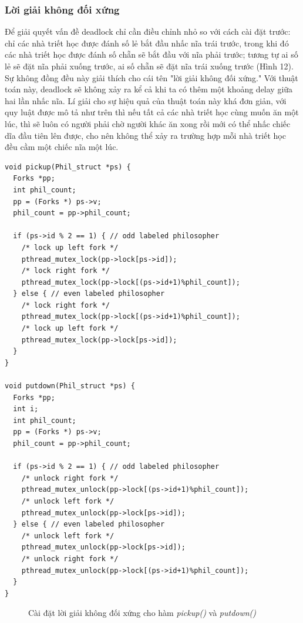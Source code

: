 \documentclass{article}
\begin{document}
\subsubsection{Lời giải không đối xứng}
Để giải quyết vấn đề deadlock chỉ cần điều chỉnh nhỏ so với cách cài đặt trước: chỉ các nhà triết học được đánh số lẻ
bắt đầu nhấc nĩa trái trước, trong khi đó các nhà triết học được đánh số chẵn sẽ bắt đầu với nĩa phải trước; tương tự
ai số lẻ sẽ đặt nĩa phải xuống trước, ai số chẵn sẽ đặt nĩa trái xuống trước (Hình 12). Sự không đồng đều này
giải thích cho cái tên "lời giải không đối xứng."
Với thuật toán này, deadlock sẽ không xảy ra kể cả khi ta có thêm một khoảng delay giữa hai lần nhấc nĩa.
Lí giải cho sự hiệu quả của thuật toán này khá đơn giản, với quy luật được mô tả như trên thì nếu tất cả
các nhà triết học cùng muốn ăn một lúc, thì sẽ luôn có người phải chờ người khác ăn xong rồi mới có thể nhấc
chiếc dĩa đầu tiên lên được, cho nên không thể xảy ra trường hợp mỗi nhà triết học đều cầm một chiếc nĩa một lúc.
\begin{shaded}
    \begin{lstlisting}
void pickup(Phil_struct *ps) {
  Forks *pp;
  int phil_count;
  pp = (Forks *) ps->v;
  phil_count = pp->phil_count;
  
  if (ps->id % 2 == 1) { // odd labeled philosopher
    /* lock up left fork */
    pthread_mutex_lock(pp->lock[ps->id]);
    /* lock right fork */       
    pthread_mutex_lock(pp->lock[(ps->id+1)%phil_count]); 
  } else { // even labeled philosopher
    /* lock right fork */ 
    pthread_mutex_lock(pp->lock[(ps->id+1)%phil_count]); 
    /* lock up left fork */
    pthread_mutex_lock(pp->lock[ps->id]);       
  }
}

void putdown(Phil_struct *ps) {
  Forks *pp;
  int i;
  int phil_count;
  pp = (Forks *) ps->v;
  phil_count = pp->phil_count;

  if (ps->id % 2 == 1) { // odd labeled philosopher
    /* unlock right fork */ 
    pthread_mutex_unlock(pp->lock[(ps->id+1)%phil_count]); 
    /* unlock left fork */
    pthread_mutex_unlock(pp->lock[ps->id]); 
  } else { // even labeled philosopher
    /* unlock left fork */
    pthread_mutex_unlock(pp->lock[ps->id]);  
    /* unlock right fork */ 
    pthread_mutex_unlock(pp->lock[(ps->id+1)%phil_count]);
  }
}
    \end{lstlisting}
\end{shaded}
\begin{figure}[h]
    \centering
    \caption{Cài đặt lời giải không đối xứng cho hàm \textit{pickup()} và \textit{putdown()}}
\end{figure}
\end{document}
